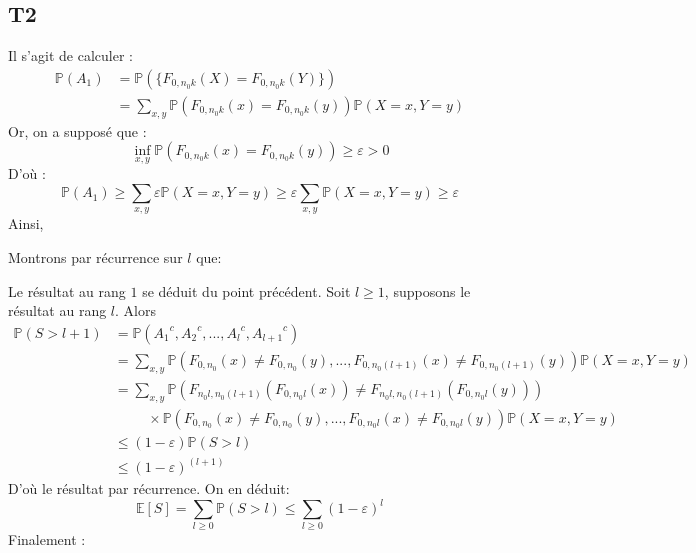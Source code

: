 \documentclass[a4paper,11pt]{article}
\begin{document}
\subsection*{T2}
Il s'agit de calculer :
\begin{equation*}
\begin{split}
\mathbb{P}(A_1)&=\mathbb{P}(\{F_{0,{n_0}k}(X)=F_{0,{n_0}k}(Y)\})\\
&=\sum_{x,y} \mathbb{P}(F_{0,{n_0}k}(x)=F_{0,{n_0}k}(y))\mathbb{P}(X=x,Y=y)
\end{split}
\end{equation*}
Or, on a supposé que :
\[\inf_{x,y}\mathbb{P}(F_{0,{n_0}k}(x)=F_{0,{n_0}k}(y))\geq\varepsilon>0\]
D'où :
\[ \mathbb{P}(A_1)\geq\sum_{x,y} \varepsilon\mathbb{P}(X=x,Y=y)\geq\varepsilon\sum_{x,y}\mathbb{P}(X=x,Y=y)\geq\varepsilon\]
Ainsi,
\begin{center}
\end{center}

Montrons par récurrence sur $l$ que:
\begin{center}
\end{center}
Le résultat au rang $1$ se déduit du point précédent.
Soit $l\geq1$, supposons le résultat au rang $l$. Alors
\begin{equation*}
\begin{split}
\mathbb{P}(S>l+1)&=\mathbb{P}({A_1}^c,{A_2}^c,...,{A_l}^c,{A_{l+1}}^c)\\
&=\sum_{x,y} \mathbb{P}(F_{0,n_0}(x)\neq F_{0,n_0}(y),...,F_{0,{n_0}(l+1)}(x)\neq F_{0,{n_0}(l+1)}(y))\mathbb{P}(X=x,Y=y)\\
&=\sum_{x,y} \mathbb{P}(F_{n_0l,n_0(l+1)}(F_{0,{n_0}l}(x))\neq F_{n_0l,n_0(l+1)}(F_{0,{n_0}l}(y))) \\
&\hspace{1cm}\times\mathbb{P}(F_{0,n_0}(x)\neq F_{0,n_0}(y),...,F_{0,{n_0}l}(x)\neq F_{0,{n_0}l}(y))\mathbb{P}(X=x,Y=y)\\
&\leq (1-\varepsilon)\mathbb{P}(S>l)\\
&\leq (1-\varepsilon)^{(l+1)}
\end{split}
\end{equation*}
D'où le résultat par récurrence.
On en déduit:
\[\mathbb{E}[S]=\sum_{l\geq0}\mathbb{P}(S>l)\leq\sum_{l\geq0}(1-\varepsilon)^l\]
Finalement :
\end{document}
